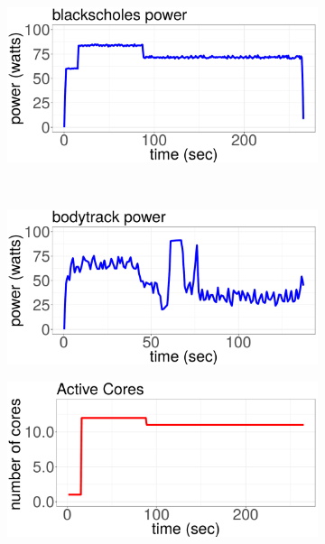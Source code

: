 \begin{figure}[p]
	\centering
	\begin{subfigure}[b]{.48\textwidth}
  	\includegraphics[width=\textwidth]{power_aware_job_scheduling/figures/activity_ratios/blackscholes_pkg_power}
  \end{subfigure}%
~
	\begin{subfigure}[b]{.48\textwidth}
  	\includegraphics[width=\textwidth]{power_aware_job_scheduling/figures/activity_ratios/bodytrack_pkg_power}
	\end{subfigure}%
	\vspace{0.1cm}
	\begin{subfigure}[b]{.48\textwidth}
  	\includegraphics[width=\textwidth]{power_aware_job_scheduling/figures/activity_ratios/blackscholes_CORES}

\end{subfigure}
\end{figure}
